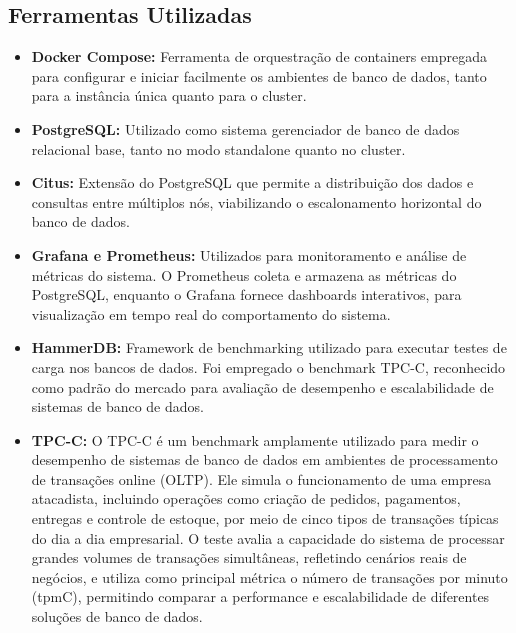 \subsection{Ferramentas Utilizadas}
\begin{itemize}
    \item \textbf{Docker Compose:} 
	Ferramenta de orquestração de containers empregada para configurar e iniciar facilmente os ambientes de banco de dados, 
	tanto para a instância única quanto para o cluster.
	
	\item \textbf{PostgreSQL:} 
	Utilizado como sistema gerenciador de banco de dados relacional base,
	tanto no modo standalone quanto no cluster.
    
    \item \textbf{Citus:} 
	Extensão do PostgreSQL que permite a distribuição dos dados e consultas entre múltiplos nós,
	viabilizando o escalonamento horizontal do banco de dados.
    
    \item \textbf{Grafana e Prometheus:} 
	Utilizados para monitoramento e análise de métricas do sistema. 
	O Prometheus coleta e armazena as métricas do PostgreSQL, enquanto o Grafana fornece dashboards interativos,
	para visualização em tempo real do comportamento do sistema.
    
    \item \textbf{HammerDB:}
	Framework de benchmarking utilizado para executar testes de carga nos bancos de dados.
	Foi empregado o benchmark TPC-C, 
	reconhecido como padrão do mercado para avaliação de desempenho e escalabilidade de sistemas de banco de dados.

	\item \textbf{TPC-C:}
	O TPC-C é um benchmark amplamente utilizado para medir o desempenho de sistemas de banco de dados em ambientes 
	de processamento de transações online (OLTP). Ele simula o funcionamento de uma empresa atacadista,
	incluindo operações como criação de pedidos, pagamentos, entregas e controle de estoque,
	por meio de cinco tipos de transações típicas do dia a dia empresarial.
	O teste avalia a capacidade do sistema de processar grandes volumes de transações simultâneas,
	refletindo cenários reais de negócios, e utiliza como principal métrica o número de transações por minuto (tpmC),
	permitindo comparar a performance e escalabilidade de diferentes soluções de banco de dados.
	

\end{itemize}
